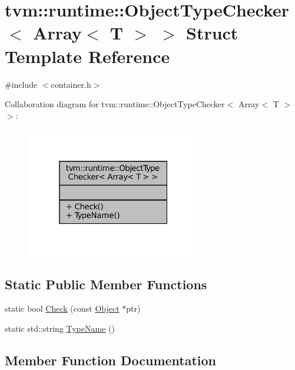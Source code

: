 \hypertarget{structtvm_1_1runtime_1_1ObjectTypeChecker_3_01Array_3_01T_01_4_01_4}{}\section{tvm\+:\+:runtime\+:\+:Object\+Type\+Checker$<$ Array$<$ T $>$ $>$ Struct Template Reference}
\label{structtvm_1_1runtime_1_1ObjectTypeChecker_3_01Array_3_01T_01_4_01_4}


{\ttfamily \#include $<$container.\+h$>$}



Collaboration diagram for tvm\+:\+:runtime\+:\+:Object\+Type\+Checker$<$ Array$<$ T $>$ $>$\+:
\nopagebreak
\begin{figure}[H]
\begin{center}
\leavevmode
\includegraphics[width=217pt]{structtvm_1_1runtime_1_1ObjectTypeChecker_3_01Array_3_01T_01_4_01_4__coll__graph}
\end{center}
\end{figure}
\subsection*{Static Public Member Functions}
\begin{DoxyCompactItemize}
\item 
static bool \hyperlink{structtvm_1_1runtime_1_1ObjectTypeChecker_3_01Array_3_01T_01_4_01_4_add60b83f5e77c1d9016b65898bcbfe69}{Check} (const \hyperlink{classtvm_1_1runtime_1_1Object}{Object} $\ast$ptr)
\item 
static std\+::string \hyperlink{structtvm_1_1runtime_1_1ObjectTypeChecker_3_01Array_3_01T_01_4_01_4_aab22b555cfe16d040c204527c73a3287}{Type\+Name} ()
\end{DoxyCompactItemize}


\subsection{Member Function Documentation}
